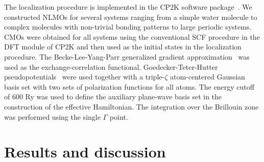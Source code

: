 \documentclass[aps,prl,reprint,amsmath,amssymb]{revtex4-1}
\begin{document}
The localization procedure is implemented in the CP2K software package~\cite{cp2kgeneral}. 
We constructed NLMOs for several systems ranging from a simple water molecule to complex molecules with non-trivial bonding patterns to large periodic systems. 
CMOs were obtained for all systems using the conventional SCF procedure in the DFT module of CP2K and then used as the initial states in the localization procedure. 
The Becke-Lee-Yang-Parr generalized gradient approximation~\cite{becke1988density, lee1988development} was used as the exchange-correlation functional.
Goedecker-Teter-Hutter pseudopotentials~\cite{goedecker1996separable} were used together with a triple-$\zeta$ atom-centered Gaussian basis set with two sets of polarization functions for all atoms. 
The energy cutoff of 600 Ry 
was used to define the auxiliary plane-wave basis set in the construction of the effective Hamiltonian. 
The integration over the Brillouin zone was performed using the single $\Gamma$ point.


\section{Results and discussion}



\end{document}

